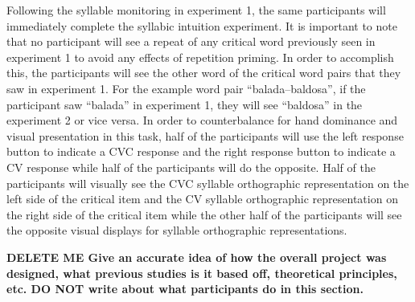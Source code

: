 Following the syllable monitoring in experiment 1, the same participants will immediately complete the syllabic intuition experiment. It is important to note that no participant will see a repeat of any critical word previously seen in experiment 1 to avoid any effects of repetition priming. In order to accomplish this, the participants will see the other word of the critical word pairs that they saw in experiment 1. For the example word pair “balada–baldosa”, if the participant saw “balada” in experiment 1, they will see “baldosa” in the experiment 2 or vice versa. In order to counterbalance for hand dominance and visual presentation in this task, half of the participants will use the left response button to indicate a CVC response and the right response button to indicate a CV response while half of the participants will do the opposite. Half of the participants will visually see the CVC syllable orthographic representation on the left side of the critical item and the CV syllable orthographic representation on the right side of the critical item while the other half of the participants will see the opposite visual displays for syllable orthographic representations.

\textbf{DELETE ME Give an accurate idea of how the overall project was designed, what previous studies is it based off, theoretical principles, etc.
DO NOT write about what participants do in this section.}

